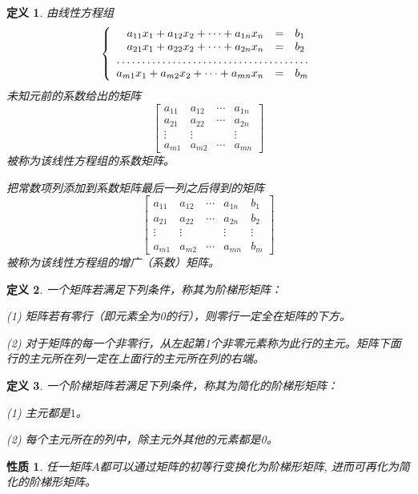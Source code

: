 \documentclass[a4paper]{book}
\newtheorem{prop}{性质}[chapter]
\newtheorem{Def}{定义}[chapter]
\newcommand{\enum}{\begin{list}{}{\setlength{\leftmargin}{0pt} \setlength{\itemindent}{2.5em} \setlength{\listparindent}{2em}}}
\begin{document}
\begin{Def}
由线性方程组
\begin{equation*}
\left\{ \begin{array}{rcl} a_{11}x_1 + a_{12}x_2 + \cdots + a_{1n}x_n & = & b_1 \\ a_{21}x_1 + a_{22}x_2 + \cdots + a_{2n}x_n & = & b_2 \\ \hdotsfor{3} \\ a_{m1}x_1 + a_{m2}x_2 + \cdots + a_{mn}x_n & = & b_m \end{array}\right.
\end{equation*}
未知元前的系数给出的矩阵
$$
\begin{bmatrix}
a_{11} & a_{12} & \cdots & a_{1n} \\ a_{21} & a_{22} & \cdots & a_{2n} \\ \vdots & \vdots & & \vdots \\ a_{m1} & a_{m2} & \cdots & a_{mn}
\end{bmatrix}
$$
被称为该线性方程组的系数矩阵。

把常数项列添加到系数矩阵最后一列之后得到的矩阵
$$
\begin{bmatrix}
a_{11} & a_{12} & \cdots & a_{1n}  & b_1 \\ a_{21} & a_{22} & \cdots & a_{2n} & b_2 \\ \vdots & \vdots & & \vdots & \vdots \\ a_{m1} & a_{m2} & \cdots & a_{mn} & b_m
\end{bmatrix}
$$
被称为该线性方程组的增广（系数）矩阵。
\end{Def}

\begin{Def}
一个矩阵若满足下列条件，称其为阶梯形矩阵：
\enum
\item[(1)]矩阵若有零行（即元素全为0的行），则零行一定全在矩阵的下方。
\item[(2)]对于矩阵的每一个非零行，从左起第1个非零元素称为此行的主元。矩阵下面行的主元所在列一定在上面行的主元所在列的右端。
\end{list}
\end{Def}

\begin{Def}
一个阶梯矩阵若满足下列条件，称其为简化的阶梯形矩阵：
\enum
\item[(1)]主元都是$1$。
\item[(2)]每个主元所在的列中，除主元外其他的元素都是0。
\end{list}
\end{Def}

\begin{prop}
任一矩阵$A$都可以通过矩阵的初等行变换化为阶梯形矩阵, 进而可再化为简化的阶梯形矩阵。
\end{prop}
\end{document}
